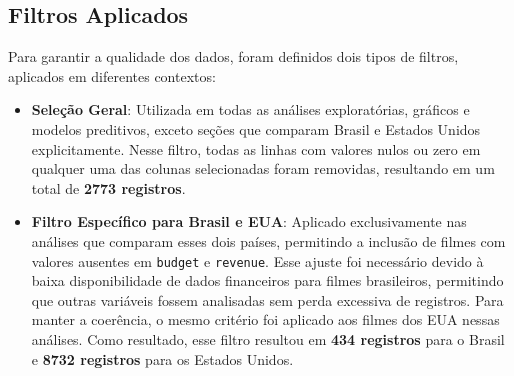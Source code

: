 \subsection{Filtros Aplicados}
Para garantir a qualidade dos dados, foram definidos dois tipos de filtros, aplicados em diferentes contextos:

\begin{itemize}
    \item \textbf{Seleção Geral}: Utilizada em todas as análises exploratórias, gráficos e modelos preditivos, exceto seções que comparam Brasil e Estados Unidos explicitamente. Nesse filtro, todas as linhas com valores nulos ou zero em qualquer uma das colunas selecionadas foram removidas, resultando em um total de \textbf{2773 registros}.
    \item \textbf{Filtro Específico para Brasil e EUA}: Aplicado exclusivamente nas análises que comparam esses dois países, permitindo a inclusão de filmes com valores ausentes em \texttt{budget} e \texttt{revenue}. Esse ajuste foi necessário devido à baixa disponibilidade de dados financeiros para filmes brasileiros, permitindo que outras variáveis fossem analisadas sem perda excessiva de registros. Para manter a coerência, o mesmo critério foi aplicado aos filmes dos EUA nessas análises. Como resultado, esse filtro resultou em \textbf{434 registros} para o Brasil e \textbf{8732 registros} para os Estados Unidos.
\end{itemize}

